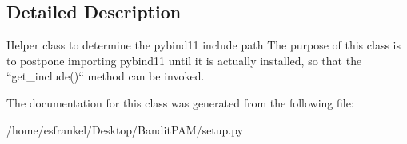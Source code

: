 \subsection{Detailed Description}
\begin{DoxyVerb}Helper class to determine the pybind11 include path
The purpose of this class is to postpone importing pybind11
until it is actually installed, so that the ``get_include()``
method can be invoked. \end{DoxyVerb}
 

The documentation for this class was generated from the following file\+:\begin{DoxyCompactItemize}
\item 
/home/esfrankel/\+Desktop/\+Bandit\+P\+A\+M/setup.\+py\end{DoxyCompactItemize}
